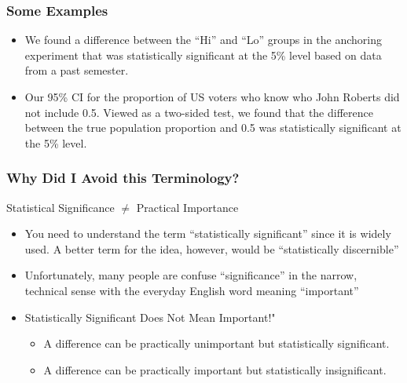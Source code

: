 \begin{frame}
\frametitle{Some Examples}

	\begin{itemize}
		\item We found a difference between the ``Hi'' and ``Lo'' groups in the anchoring experiment that was statistically significant at the 5\% level based on data from a past semester.
		\item Our 95\% CI for the proportion of US voters who know who John Roberts did not include 0.5. Viewed as a two-sided test, we found that the difference between the true population proportion and 0.5 was statistically significant at the 5\% level.
	\end{itemize}

\end{frame}
\begin{frame}
\frametitle{Why Did I Avoid this Terminology?}
\small
\begin{block}{Statistical Significance $\neq$ Practical Importance}
	\begin{itemize}
		\item You need to understand the term ``statistically significant'' since it is widely used. A better term for the idea, however, would be ``statistically discernible''
		\item Unfortunately, many people are confuse ``significance'' in the narrow, technical sense with the everyday English word meaning ``important'' 
		\item \alert{Statistically Significant Does Not Mean Important!"}
			\begin{itemize}
				\item A difference can be practically unimportant but statistically significant.
				\item A difference can be practically important but statistically insignificant.
			\end{itemize}
	\end{itemize}
\end{block}


\end{frame}



